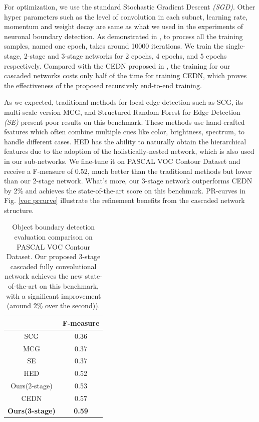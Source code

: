 \documentclass[senior]{IPSstyle}
\begin{document}
For optimization, we use the standard Stochastic Gradient Descent \emph{(SGD)}. Other hyper parameters such as the level of convolution in each subnet, learning rate, momentum and weight decay are same as what we used in the experiments of neuronal boundary detection. As demonstrated in \cite{Yang2016}, to process all the training samples, named one epoch, takes around 10000 iterations. We train the single-stage, 2-stage and 3-stage networks for 2 epochs, 4 epochs, and 5 epochs respectively. Compared with the CEDN proposed in \cite{Yang2016}, the training for our cascaded networks costs only half of the time for training CEDN, which proves the effectiveness of the proposed recursively end-to-end training.

As we expected, traditional methods for local edge detection such as SCG, its multi-scale version MCG\cite{Arbelaez2014}, and Structured Random Forest for Edge Detection \emph{(SE)}\cite{Dollar2013} present poor results on this benchmark. These methods use hand-crafted features which often combine multiple cues like color, brightness, spectrum, to handle different cases. HED\cite{Xie2015} has the ability to naturally obtain the hierarchical features due to the adoption of the holistically-nested network, which is also used in our sub-networks. We fine-tune it on PASCAL VOC Contour Dataset and receive a F-measure of 0.52, much better than the traditional methods but lower than our 2-stage network. What's more, our 3-stage network outperforms CEDN\cite{Yang2016} by 2\% and achieves the state-of-the-art score on this benchmark. PR-curves in Fig. \ref{voc prcurve} illustrate the refinement benefits from the cascaded network structure.

\begin{table}[t]
\renewcommand{\arraystretch}{0.8}
\caption{Object boundary detection evaluation comparison on PASCAL VOC Contour Dataset\cite{Yang2016}. Our proposed 3-stage cascaded fully convolutional network achieves the new state-of-the-art on this benchmark, with a significant improvement (around 2\% over the second)).}
\label{outcome}
\begin{center}
\begin{tabular}{|c|c|}
\hline
&\multicolumn{1}{c|}{F-measure}\\
\hline
SCG\cite{Arbelaez2014} 			& 0.36	\\	\hline
MCG\cite{Arbelaez2014} 			& 0.37 	\\	\hline
SE\cite{Dollar2013}			& 0.37	 \\	\hline
HED\cite{Xie2015} 			& 0.52	\\	\hline
Ours(2-stage) 			& 0.53	\\	\hline
CEDN\cite{Yang2016}		& 0.57	\\	\hline
\textbf{Ours(3-stage)} 	& \textbf{0.59}	\\	\hline
\end{tabular}
\end{center}
\label{voc fscore}
\end{table}
\end{document}
